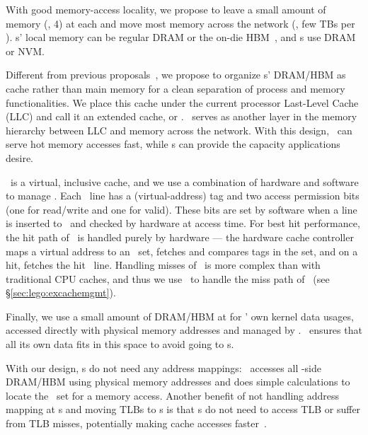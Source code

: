 With good memory-access locality, we propose to %
leave a small amount of memory (\eg, 4\GB) at each \pcomponent{}
and move most memory across the network (\eg, few TBs per \mcomponent{}).
\pcomponent{}s' local memory can be regular DRAM 
or the on-die HBM~\cite{HBM-JEDEC,Knights-Landing},
and \mcomponent{}s use DRAM or NVM.

Different from previous proposals~\cite{Lim09-disaggregate}, 
we propose to organize \pcomponent{}s' DRAM/HBM as cache rather than main memory
for a clean separation of process and memory functionalities.
We place this cache under the current processor Last-Level Cache (LLC)
and call it an extended cache, or {\em \excache}.
\excache\ serves as another layer in the memory hierarchy between LLC and memory across the network.
With this design, \excache\ can serve hot memory accesses fast, while \mcomponent{}s can provide the capacity applications desire. 

\excache\ is a virtual, inclusive cache,
and we use a combination of hardware and software to manage \excache.
Each \excache\ line has a (virtual-address) tag and two access permission bits (one for read/write and one for valid).
These bits are set by software when a line is inserted to \excache\ and checked by hardware at access time.
For best hit performance, the hit path of \excache\ is handled purely by hardware
--- the hardware cache controller maps a virtual address to an \excache\ set, 
fetches and compares tags in the set, and on a hit, fetches the hit \excache\ line.
Handling misses of \excache\ is more complex than with traditional CPU caches, 
and thus we use \lego\ to handle the miss path of \excache\ (see \S\ref{sec:lego:excachemgmt}).

Finally, we use a small amount of DRAM/HBM at \pcomponent{} for \lego' own kernel data usages,
accessed directly with physical memory addresses and managed by \lego. 
\lego\ ensures that all its own data fits in this space to avoid going to \mcomponent{}s.

With our design, \pcomponent{}s do not need any address mappings:
\lego\ accesses all \pcomponent{}-side DRAM/HBM using physical memory addresses
and does simple calculations to locate the \excache\ set for a memory access.
Another benefit of not handling address mapping at \pcomponent{}s and moving TLBs to \mcomponent{}s 
is that \pcomponent{}s do not need to access TLB or suffer from TLB misses,
potentially making \pcomponent{} cache accesses faster~\cite{Kaxiras-ISCA13}.

